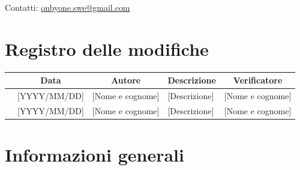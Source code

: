 \documentclass[11pt, a4paper]{article}
\begin{document}
\begin{titlepage}
    \vspace{0.5cm}
    
    {\large Contatti: \href{mailto:onbyone.swe@gmail.com}{onbyone.swe@gmail.com} }
    
\end{titlepage}

\section*{Registro delle modifiche}

\vspace{1cm}
\begin{center}
    \renewcommand{\arraystretch}{1.5}
    \begin{tabularx}{\textwidth}{|c|c|c|X|c|}
        \hline
        \rowcolor{gray!10} 
        \multicolumn{1}{|c|}{\textbf{Versione}} & 
        \multicolumn{1}{c|}{\textbf{Data}} & 
        \multicolumn{1}{c|}{\textbf{Autore}} & 
        \multicolumn{1}{c|}{\textbf{Descrizione}} & 
        \multicolumn{1}{c|}{\textbf{Verificatore}} \\
        \hline
        [1.X.X] & [YYYY/MM/DD] & [Nome e cognome] & [Descrizione] & [Nome e cognome] \\
        \hline
        [0.1.0] & [YYYY/MM/DD] & [Nome e cognome] & [Descrizione] & [Nome e cognome] \\
        \hline
    \end{tabularx}
\end{center}
\vfill
\newpage

\tableofcontents
\newpage

\section{Informazioni generali}
\end{document}
